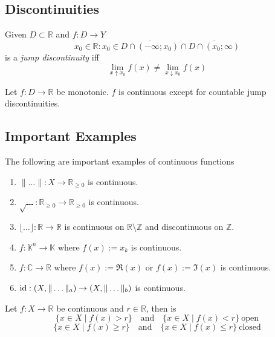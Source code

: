 \subsection{Discontinuities}
\begin{definition}
   Given \(D \subset \mathbb{R}\) and \(f: D \to Y\)
   \[x_0 \in \mathbb{R}: x_0 \in \overline{D \cap (-\infty; x_0)} \cap \overline{D \cap (x_0; \infty)}\]
   is a \emph{jump discontinuity} iff
   \[\lim_{x \uparrow x_0} f(x) \neq \lim_{x \downarrow x_0} f(x)\]
\end{definition}

\begin{theorem}
   Let \(f:D \to \mathbb{R}\) be monotonic.
   \(f\) is continuous except for countable jump discontinuities.
\end{theorem}

\subsection{Important Examples}
\begin{proposition}
   The following are important examples of continuous functions
   \begin{enumerate}[label=\roman*, align=Center]
      \item \(\|\ldots\|: X \to \mathbb{R}_{\geq 0}\) is continuous.
      \item \(\sqrt{\ldots}: \mathbb{R}_{\geq 0} \to \mathbb{R}_{\geq 0}\) is continuous.
      \item \(\lfloor\ldots\rfloor: \mathbb{R} \to \mathbb{R}\) is continuous on \(\mathbb{R}\setminus\mathbb{Z}\) and discontinuous on \(\mathbb{Z}\).
      \item \(f: \mathbb{K}^n \to \mathbb{K}\) where \(f(x) := x_k\) is continuous.
      \item \(f: \mathbb{C} \to \mathbb{R}\) where \(f(x) := \Re(x)\) or \(f(x) := \Im(x)\) is continuous.
      \item \(\operatorname{id}: (X, \|\ldots\|_a) \to (X, \|\ldots\|_b)\) is continuous.
   \end{enumerate}
\end{proposition}

\begin{proposition}
   Let \(f: X \to \mathbb{R}\) be continuous and \(r \in \mathbb{R}\), then is
   \[\{x \in X \mid f(x) > r\} \quad\text{and}\quad \{x \in X \mid f(x) < r\}~\text{open}\]
   \[\{x \in X \mid f(x) \geq r\} \quad\text{and}\quad \{x \in X \mid f(x) \leq r\}~\text{closed}\]
\end{proposition}

